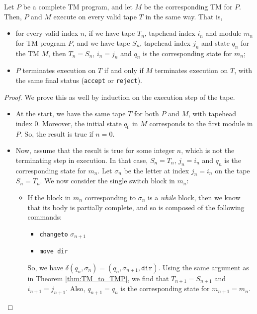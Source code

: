 \begin{appendices}
\begin{theorem}
    Let $P$ be a complete TM program, and let $M$ be the corresponding TM for $P$. Then, $P$ and $M$ execute on every valid tape $T$ in the same way. That is,
    \begin{itemize}
        \item for every valid index $n$, if we have tape $T_n$, tapehead index $i_n$ and module $m_n$ for TM program $P$, and we have tape $S_n$, tapehead index $j_n$ and state $q_n$ for the TM $M$, then $T_n = S_n$, $i_n = j_n$ and $q_n$ is the corresponding state for $m_n$;
        \item $P$ terminates execution on $T$ if and only if $M$ terminates execution on $T$, with the same final status (\texttt{accept} or \texttt{reject}).
    \end{itemize}
\end{theorem}
\begin{proof}
    We prove this as well by induction on the execution step of the tape. 
    \begin{itemize}
        \item At the start, we have the same tape $T$ for both $P$ and $M$, with tapehead index $0$. Moreover, the initial state $q_0$ in $M$ corresponds to the first module in $P$. So, the result is true if $n = 0$. 
        
        \item Now, assume that the result is true for some integer $n$, which is not the terminating step in execution. In that case, $S_n = T_n$, $j_n = i_n$ and $q_n$ is the corresponding state for $m_n$. Let $\sigma_n$ be the letter at index $j_n = i_n$ on the tape $S_n = T_n$. We now consider the single switch block in $m_n$:
        \begin{itemize}
            \item If the block in $m_n$ corresponding to $\sigma_n$ is a \textit{while} block, then we know that its body is partially complete, and so is composed of the following commands:
            \begin{itemize}
                \item \texttt{changeto} $\sigma_{n+1}$
                \item \texttt{move dir}
            \end{itemize}
            So, we have $\delta(q_n, \sigma_n) = (q_n, \sigma_{n+1}, \texttt{dir})$. Using the same argument as in Theorem \ref{thm:TM_to_TMP}, we find that $T_{n+1} = S_{n+1}$ and $i_{n+1} = j_{n+1}$. Also, $q_{n+1} = q_n$ is the corresponding state for $m_{n+1} = m_n$. 
            

\end{itemize}
\end{itemize}
\end{proof}
\end{appendices}

